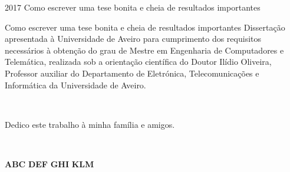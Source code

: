 \documentclass[11pt,twoside,a4paper]{report}
\def\ThesisYear{2017}
\begin{document}
%
%

\TitlePage
  \HEADER{\BAR\FIG{}}
         {\ThesisYear}
        {Como escrever uma tese bonita e cheia de resultados importantes}
\EndTitlePage
\titlepage\ \endtitlepage %


%
%

\TitlePage
  \HEADER{}{\ThesisYear}
        {Como escrever uma tese bonita e cheia de resultados importantes}
  \vspace*{15mm}
  \TEXT{}
       {Disserta\c c\~ao apresentada \`a Universidade de Aveiro para cumprimento dos requisitos necess\'arios \`a obten\c c\~ao do
        grau de Mestre em Engenharia de Computadores e Telem\'atica, realizada sob a orienta\c c\~ao cient\'ifica do Doutor Il\'idio Oliveira, Professor auxiliar do Departamento de Eletr\'onica, Telecomunica\c c\~oes e Inform\'atica da Universidade de Aveiro.}
\EndTitlePage
\titlepage\ \endtitlepage %


\titlepage\ 

\vspace*{30mm}\begin{flushright}
Dedico este trabalho à minha família e amigos.
\end{flushright}
\endtitlepage

\titlepage\ \endtitlepage %

\TitlePage
  \vspace*{55mm}
       {}
       {\textbf{ABC}}
  \vspace*{5mm}
       {\textbf{DEF}}
  \vspace*{5mm}
  \TEXT{}
       {\textbf{GHI}}
  \vspace*{5mm}
  \TEXT{}
       {\textbf{KLM}}
\EndTitlePage
\titlepage\ \endtitlepage %
\end{document}
